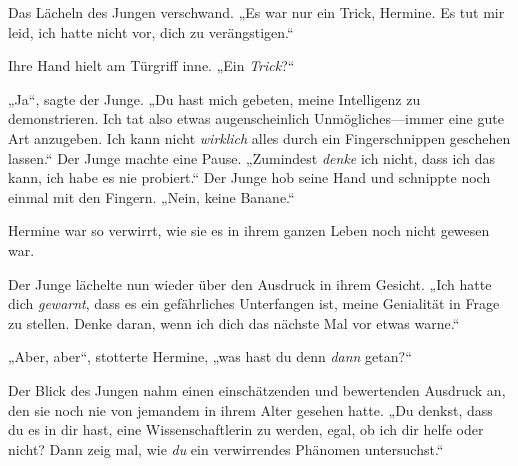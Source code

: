 Das Lächeln des Jungen verschwand. „Es war nur ein Trick, Hermine. Es tut mir leid, ich hatte nicht vor, dich zu verängstigen.“

Ihre Hand hielt am Türgriff inne. „Ein \emph{Trick}?“

„Ja“, sagte der Junge. „Du hast mich gebeten, meine Intelligenz zu demonstrieren. Ich tat also etwas augenscheinlich Unmögliches—immer eine gute Art anzugeben. Ich kann nicht \emph{wirklich} alles durch ein Fingerschnippen geschehen lassen.“ Der Junge machte eine Pause. „Zumindest \emph{denke} ich nicht, dass ich das kann, ich habe es nie probiert.“ Der Junge hob seine Hand und schnippte noch einmal mit den Fingern. „Nein, keine Banane.“

Hermine war so verwirrt, wie sie es in ihrem ganzen Leben noch nicht gewesen war.

Der Junge lächelte nun wieder über den Ausdruck in ihrem Gesicht. „Ich hatte dich \emph{gewarnt}, dass es ein gefährliches Unterfangen ist, meine Genialität in Frage zu stellen. Denke daran, wenn ich dich das nächste Mal vor etwas warne.“

„Aber, aber“, stotterte Hermine, „was hast du denn \emph{dann} getan?“

Der Blick des Jungen nahm einen einschätzenden und bewertenden Ausdruck an, den sie noch nie von jemandem in ihrem Alter gesehen hatte. „Du denkst, dass du es in dir hast, eine Wissenschaftlerin zu werden, egal, ob ich dir helfe oder nicht? Dann zeig mal, wie \emph{du} ein verwirrendes Phänomen untersuchst.“

